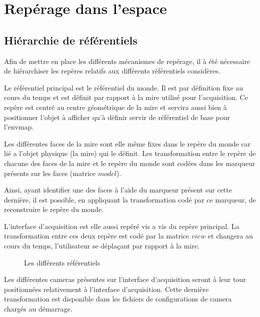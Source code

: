 \documentclass[10pt,a4paper,twoside, twocolumn]{report}
\newcommand*{\rootPath}{../}
\begin{document}
\chapter{Repérage dans l'espace}

\section{Hiérarchie de référentiels}

Afin de mettre en place les différents mécanismes de repérage, il à été nécessaire de hiérarchiser les repères relatifs aux différents référentiels considères.

Le référentiel principal est le référentiel du monde. Il est par définition fixe au cours du temps et est définit par rapport à la mire utilisé pour l'acquisition. Ce repère est centré au centre géométrique de la mire et servira aussi bien à positionner l'objet à afficher qu'à définir servir de référentiel de base pour l'envmap.

Les différentes faces de la mire sont elle même fixes dans le repère du monde car lié a l'objet physique (la mire) qui le définit. Les transformation entre le repère de chacune des faces de la mire et le repère du monde sont codées dans les marqueur présents sur les faces (matrice $model$).

Ainsi, ayant identifier une des faces à l'aide du marqueur présent sur cette dernière, il est possible, en appliquant la transformation codé par ce marqueur, de reconstruire le repère du monde.

L'interface d'acquisition est elle aussi repéré vis a vis du repère principal. La transformation entre ces deux repère est codé par la matrice $view$ et changera au cours du temps, l'utilisateur se déplaçant par rapport à la mire.

\begin{figure}[!ht]
	\centering
	
	\caption{Les différents référentiels}
	\label{fig:tikz:spaceHierarchie}
\end{figure}

Les différentes cameras présentes sur l'interface d'acquisition seront à leur tour positionnées relativement à l'interface d'acquisition. Cette dernière transformation est disponible dans les fichiers de configurations de camera chargés au démarrage.
\end{document}
